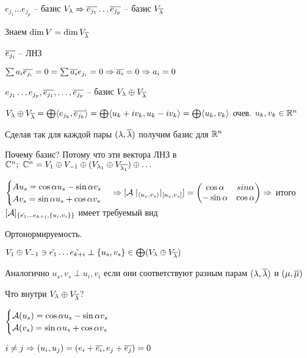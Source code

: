\documentclass[12pt]{article}
\begin{document}
\begin{enumerate}
    $e_{j_1} \ldots e_{j_p}$ -- базис $V_\lambda \Rightarrow \overline{e_{j_1}} \ldots \overline{e_{j_p}}$ -- базис $V_{\overline{\lambda}}$

    Знаем $\dim V = \dim V_{\overline{\lambda}}$

    $\overline{e_{j_i}}$ -- ЛНЗ 

    $\sum a_i\overline{e_{j_i}} = 0 = \sum \overline{a_i} e_{j_i} = 0 \Rightarrow \overline{a_i} = 0 \Rightarrow a_i = 0$

    $e_{j_1} \ldots e_{j_p}, \overline{e_{j_1}}, \ldots, \overline{e_{j_p}}$ -- базис $V_\lambda \oplus V_{\overline{\lambda}}$

    $V_\lambda \oplus V_{\overline{\lambda}} = \bigoplus\langle e_{j_k}, \overline{e_{j_k}} \rangle = \bigoplus\langle u_k + iv_k, u_k - iv_k \rangle = \bigoplus\langle u_k, v_k \rangle$ очев. $u_k, v_k \in \mathbb R^n$

    Сделав так для каждой пары $(\lambda, \overline{\lambda})$ получим базис для $\mathbb R^n$

    Почему базис? Потому что эти вектора ЛНЗ в $\mathbb C^n;\ \mathbb C^n = V_1 \oplus V_{-1} \oplus (V_{\lambda_1} \oplus V_{\overline{\lambda_1}}) \oplus \ldots$

    $\begin{cases}
        Au_s = \cos \alpha u_s - \sin \alpha v_s \\
        Av_s = \sin \alpha u_s + \cos \alpha v_s
    \end{cases} \Rightarrow [\mathcal{A}\mid_{\langle u_s, v_s \rangle}\mid_{[u_s, v_s]}] = \begin{pmatrix}
        \cos \alpha & sin \alpha \\
        -\sin \alpha & \cos \alpha
    \end{pmatrix} \Rightarrow$ итого $[\mathcal{A}]_{\{\tilde{e_1} \ldots e_{k + j}, \{u_i, v_i\}\}}$ имеет требуемый вид

    Ортонормируемость.

    $V_1 \oplus V_{-1} \ni \tilde{e_1} \ldots \tilde{e_{k + i}} \perp \{u_s, v_s\} \in \bigoplus (V_\lambda \oplus V_{\overline{\lambda}})$

    Аналогично $u_s, v_s \perp u_i, v_i$ если они соответствуют разным парам $(\lambda, \overline{\lambda})$ и $(\mu, \overline{\mu})$

    Что внутри $V_\lambda \oplus V_{\overline{\lambda}}$?

    $\begin{cases}
        \mathcal{A}(u_s) = \cos \alpha u_s - \sin \alpha v_s \\
        \mathcal{A}(v_s) = \sin \alpha u_s + \cos \alpha v_s
    \end{cases}$

    $i \neq j \Rightarrow (u_i, u_j) = (e_i + \overline{e_i}, e_j + \overline{e_j}) = 0$


\end{enumerate}
\end{document}
